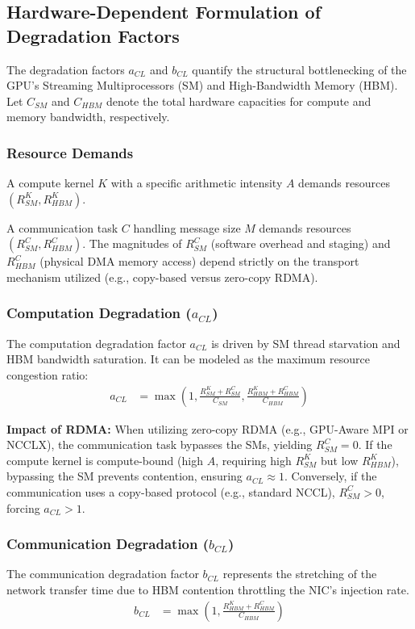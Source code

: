 \documentclass[twocolumn, secnumarabic, amssymb, nobibnotes, aps, prd, amsmath, nofootinbib]{revtex4-2}
\begin{document}
\subsection{Hardware-Dependent Formulation of Degradation Factors}

The degradation factors $a_{CL}$ and $b_{CL}$ quantify the structural bottlenecking of the GPU's Streaming Multiprocessors (SM) and High-Bandwidth Memory (HBM). Let $C_{SM}$ and $C_{HBM}$ denote the total hardware capacities for compute and memory bandwidth, respectively.

\subsubsection{Resource Demands}
A compute kernel $K$ with a specific arithmetic intensity $A$ demands resources $(R_{SM}^K, R_{HBM}^K)$.

A communication task $C$ handling message size $M$ demands resources $(R_{SM}^C, R_{HBM}^C)$. The magnitudes of $R_{SM}^C$ (software overhead and staging) and $R_{HBM}^C$ (physical DMA memory access) depend strictly on the transport mechanism utilized (e.g., copy-based versus zero-copy RDMA).

\subsubsection{Computation Degradation ($a_{CL}$)}
The computation degradation factor $a_{CL}$ is driven by SM thread starvation and HBM bandwidth saturation. It can be modeled as the maximum resource congestion ratio:
\begin{align*}
    a_{CL} &= \max\left(1, \frac{R_{SM}^K + R_{SM}^C}{C_{SM}}, \frac{R_{HBM}^K + R_{HBM}^C}{C_{HBM}}\right)
\end{align*}

\textbf{Impact of RDMA:} When utilizing zero-copy RDMA (e.g., GPU-Aware MPI or NCCLX), the communication task bypasses the SMs, yielding $R_{SM}^C = 0$. If the compute kernel is compute-bound (high $A$, requiring high $R_{SM}^K$ but low $R_{HBM}^K$), bypassing the SM prevents contention, ensuring $a_{CL} \approx 1$. Conversely, if the communication uses a copy-based protocol (e.g., standard NCCL), $R_{SM}^C > 0$, forcing $a_{CL} > 1$.

\subsubsection{Communication Degradation ($b_{CL}$)}
The communication degradation factor $b_{CL}$ represents the stretching of the network transfer time due to HBM contention throttling the NIC's injection rate. 
\begin{align*}
    b_{CL} &= \max\left(1, \frac{R_{HBM}^K + R_{HBM}^C}{C_{HBM}}\right)
\end{align*}
\end{document}
